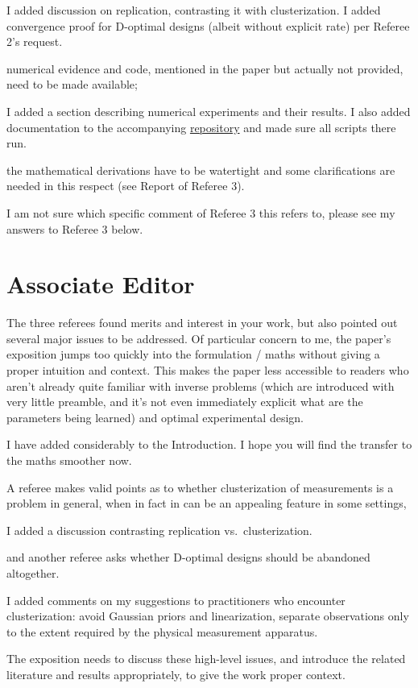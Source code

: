\documentclass{article}
\begin{document}
\AR I added discussion on replication, contrasting it with
clusterization. I added convergence proof for D-optimal designs
(albeit without explicit rate) per Referee 2's request.
    
\RC numerical evidence and code, mentioned in the paper but actually
not provided, need to be made available;
    
\AR I added a section describing numerical experiments and their
results. I also added documentation to the accompanying
\href{https://github.com/yairdaon/OED}{repository} and made sure all
scripts there run.

\RC the mathematical derivations have to be watertight and some
clarifications are needed in this respect (see Report of Referee 3).
  
\AR I am not sure which specific comment of Referee 3 this refers to,
please see my answers to Referee 3 below.
   

\section{Associate Editor}\label{ae}
\RC The three referees found merits and interest in your work, but also
pointed out several major issues to be addressed. Of particular
concern to me, the paper's exposition jumps too quickly into the
formulation / maths without giving a proper intuition and
context. This makes the paper less accessible to readers who aren't
already quite familiar with inverse problems (which are introduced
with very little preamble, and it's not even immediately explicit what
are the parameters being learned) and optimal experimental design.

\AR I have added considerably to the Introduction. I hope you will
find the transfer to the maths smoother now.


\RC A referee makes valid points as to whether clusterization of
measurements is a problem in general, when in fact in can be an
appealing feature in some settings,

\AR I added a discussion contrasting replication vs.~clusterization.

\RC and another referee asks whether D-optimal designs should be
abandoned altogether.

\AR I added comments on my suggestions to practitioners who encounter
clusterization: avoid Gaussian priors and linearization, separate
observations only to the extent required by the physical measurement
apparatus.


\RC The exposition needs to discuss these high-level
issues, and introduce the related literature and results
appropriately, to give the work proper context.
\end{document}
